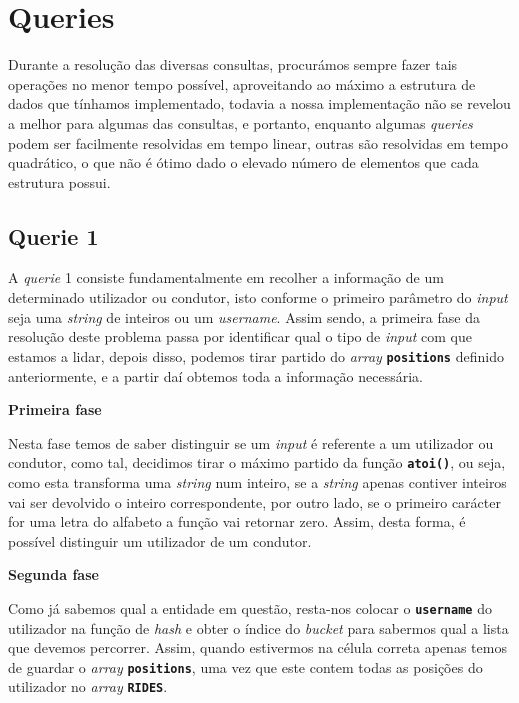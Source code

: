 \documentclass[12pt,a4paper]{report}
\begin{document}
\chapter{Queries}

Durante a resolução das diversas consultas, procurámos sempre fazer tais operações no menor tempo possível, aproveitando ao máximo a estrutura de dados que tínhamos implementado, todavia a nossa implementação não se revelou a melhor para algumas das consultas, e portanto, enquanto algumas \textit{queries} podem ser facilmente resolvidas em tempo linear, outras são resolvidas em tempo quadrático, o que não é ótimo dado o elevado número de elementos que cada estrutura possui.

\section{Querie 1}

A \textit{querie} 1 consiste fundamentalmente em recolher a informação de um determinado utilizador ou condutor, isto conforme o primeiro parâmetro do \textit{input} seja uma \textit{string} de inteiros ou um \textit{username}. Assim sendo, a primeira fase da resolução deste problema passa por identificar qual o tipo de \textit{input} com que estamos a lidar, depois disso, podemos tirar partido do \textit{array} \textbf{\small\texttt{positions}} definido anteriormente, e a partir daí obtemos toda a informação necessária.    

\normalsize\textbf{Primeira fase }{\titlerule[0.5pt]}

Nesta fase temos de saber distinguir se um \textit{input} é referente a um utilizador ou condutor, como tal, decidimos tirar o máximo partido da função \textbf{\small\texttt{atoi()}}, ou seja, como esta transforma uma \textit{string} num inteiro, se a \textit{string} apenas contiver inteiros vai ser devolvido o inteiro correspondente, por outro lado, se o primeiro carácter for uma letra do alfabeto a função vai retornar zero. Assim, desta forma, é possível distinguir um utilizador de um condutor.  

\normalsize\textbf{Segunda fase }{\titlerule[0.5pt]}

Como já sabemos qual a entidade em questão, resta-nos colocar o \textbf{\small\texttt{username}} do utilizador na função de \textit{hash} e obter o índice do \textit{bucket} para sabermos qual a lista que devemos percorrer. Assim, quando estivermos na célula correta apenas temos de guardar o \textit{array} \textbf{\small\texttt{positions}}, uma vez que este contem todas as posições do utilizador no \textit{array} \textbf{\small\texttt{RIDES}}.
\end{document}
